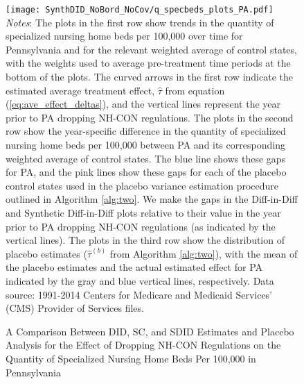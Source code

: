 \documentclass[../Main.tex]{subfiles}
\begin{document}
\newpage
{}
\begin{figure}[t] 
    \setlength{}
	\caption{\label{fig:q_specbeds_plots_pa} \centering A Comparison Between DID, SC, and SDID Estimates and Placebo Analysis for the Effect of Dropping NH-CON Regulations on the Quantity of Specialized Nursing Home Beds Per 100,000 in Pennsylvania} {\centering\texttt{[image: SynthDID\_NoBord\_NoCov/q\_specbeds\_plots\_PA.pdf]}}
    \vspace{-1.4cm}\\
    \scriptsize
		\textit{Notes}: The plots in the first row show trends in the quantity of specialized nursing home beds per 100,000 over time for Pennsylvania and for the relevant weighted average of control states, with the weights used to average pre-treatment time periods at the bottom of the plots. The curved arrows in the first row indicate the estimated average treatment effect, $\hat{\tau}$ from equation (\ref{eq:ave_effect_deltas}), and the vertical lines represent the year prior to PA dropping NH-CON regulations. The plots in the second row show the year-specific difference in the quantity of specialized nursing home beds per 100,000 between PA and its corresponding weighted average of control states. The blue line shows these gaps for PA, and the pink lines show these gaps for each of the placebo control states used in the placebo variance estimation procedure outlined in Algorithm \ref{alg:two}. We make the gaps in the Diff-in-Diff and Synthetic Diff-in-Diff plots relative to their value in the year prior to PA dropping NH-CON regulations (as indicated by the vertical lines). The plots in the third row show the distribution of placebo estimates ($\hat{\tau}^{(b)}$ from Algorithm \ref{alg:two}), with the mean of the placebo estimates and the actual estimated effect for PA indicated by the gray and blue vertical lines, respectively. Data source: 1991-2014 Centers for Medicare and Medicaid Services’ (CMS) Provider of Services files.
\end{figure}
\restoregeometry
\clearpage
\end{document}
